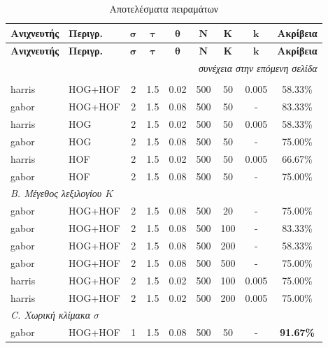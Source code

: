 \documentclass[12pt, a4paper]{article}
\begin{document}
\setlength{\tabcolsep}{5pt}
\small
\begin{longtable}{llccccccc}
\caption{Αποτελέσματα πειραμάτων}
\label{tab:results} \\
\toprule
\textbf{Ανιχνευτής} & \textbf{Περιγρ.} & $\boldsymbol{\sigma}$ & $\boldsymbol{\tau}$ & $\boldsymbol{\theta}$ & $\boldsymbol{N}$ & $\boldsymbol{K}$ & $\boldsymbol{k}$ & \textbf{Ακρίβεια} \\
\midrule
\endfirsthead
\toprule
\textbf{Ανιχνευτής} & \textbf{Περιγρ.} & $\boldsymbol{\sigma}$ & $\boldsymbol{\tau}$ & $\boldsymbol{\theta}$ & $\boldsymbol{N}$ & $\boldsymbol{K}$ & $\boldsymbol{k}$ & \textbf{Ακρίβεια} \\
\midrule
\endhead
\midrule
\multicolumn{9}{r}{\textit{συνέχεια στην επόμενη σελίδα}} \\
\endfoot
\bottomrule
\endlastfoot
\multicolumn{9}{l}{\textit{A. Βασικά πειράματα (detector \& descriptor type)}} \\
harris       & HOG+HOF & 2 & 1.5 & 0.02  & 500 & 50 & 0.005 & 58.33\% \\
gabor        & HOG+HOF & 2 & 1.5 & 0.08  & 500 & 50 & -    & 83.33\% \\
harris       & HOG     & 2 & 1.5 & 0.02  & 500 & 50 & 0.005 & 58.33\% \\
gabor        & HOG     & 2 & 1.5 & 0.08  & 500 & 50 & -    & 75.00\% \\
harris       & HOF     & 2 & 1.5 & 0.02  & 500 & 50 & 0.005 & 66.67\% \\
gabor        & HOF     & 2 & 1.5 & 0.08  & 500 & 50 & -    & 75.00\% \\
\midrule
\multicolumn{9}{l}{\textit{B. Μέγεθος λεξιλογίου $K$}} \\
gabor        & HOG+HOF & 2 & 1.5 & 0.08  & 500 & 20  & - & 75.00\% \\
gabor        & HOG+HOF & 2 & 1.5 & 0.08  & 500 & 100 & - & 83.33\% \\
gabor        & HOG+HOF & 2 & 1.5 & 0.08  & 500 & 200 & - & 58.33\% \\
gabor        & HOG+HOF & 2 & 1.5 & 0.08  & 500 & 500 & - & 75.00\% \\
harris       & HOG+HOF & 2 & 1.5 & 0.02  & 500 & 100 & 0.005 & 75.00\% \\
harris       & HOG+HOF & 2 & 1.5 & 0.02  & 500 & 200 & 0.005 & 75.00\% \\
\midrule
\multicolumn{9}{l}{\textit{C. Χωρική κλίμακα $\sigma$}} \\
gabor        & HOG+HOF & 1 & 1.5 & 0.08  & 500 & 50 & - & \textbf{91.67\%} \\

\end{longtable}
\end{document}
